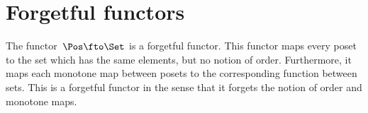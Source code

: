 \section{Forgetful functors}


\begin{example}
    The functor~$\Pos \fto \Set$ is a forgetful functor.
    This functor maps every poset to the set which has the same elements, but no notion of order.
    Furthermore, it maps each monotone map between posets to the corresponding function between sets.
    This is a forgetful functor in the sense that it forgets the notion of order and monotone maps.
\end{example}
